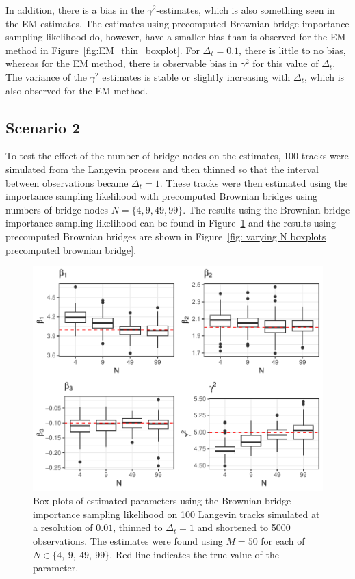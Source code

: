 In addition, there is a bias in the $\gamma^2$-estimates, which is also something seen in the EM estimates. The estimates using precomputed Brownian bridge importance sampling likelihood do, however, have a smaller bias than is observed for the EM method in Figure~\ref{fig:EM_thin_boxplot}. For $\Delta_t=0.1$, there is little to no bias, whereas for the EM method, there is observable bias in $\gamma^2$ for this value of $\Delta_t$. The variance of the $\gamma^2$ estimates is stable or slightly increasing with $\Delta_t$, which is also observed for the EM method.


\subsection{Scenario 2}
To test the effect of the number of bridge nodes on the estimates, 100 tracks were simulated from the Langevin process and then thinned so that the interval between observations became $\Delta_t =1$. These tracks were then estimated using the importance sampling likelihood with precomputed Brownian bridges using numbers of bridge nodes $N =\{4,9,49,99\}$. The results using the Brownian bridge importance sampling likelihood can be found in Figure~\ref{fig: varying N boxplots brownian bridge} and the results using precomputed Brownian bridges are shown in Figure~\ref{fig: varying N boxplots precomputed brownian bridge}. 

\begin{figure}[H]
    \centering
    \includegraphics[width=\linewidth]{Images/Results/varying N estimates BB.pdf}
    \caption[Box plots of Parameter Estimates using Brownian bridge importance sampling using different number of bridge nodes]{Box plots of estimated parameters using the Brownian bridge importance sampling likelihood on 100 Langevin tracks simulated at a resolution of $0.01$, thinned to $\Delta_t = 1$ and shortened to 5000 observations. The estimates were found using $M=50$ for each of $N \in \{4 , \ 9, \ 49, \ 99\}$. Red line indicates the true value of the parameter.}
    \label{fig: varying N boxplots brownian bridge}
\end{figure}

